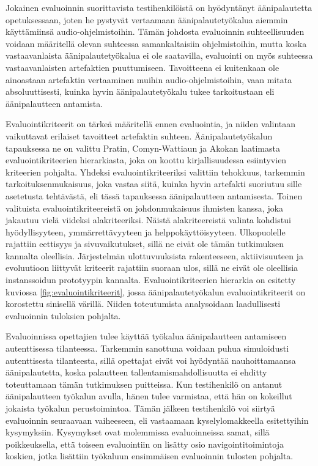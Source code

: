 \documentclass[utf8]{gradu3}
\begin{document}
Jokainen evaluoinnin suorittavista testihenkilöistä on hyödyntänyt äänipalautetta opetuksessaan, joten he pystyvät vertaamaan äänipalautetyökalua aiemmin käyttämiinsä audio-ohjelmistoihin. Tämän johdosta evaluoinnin suhteellisuuden voidaan määritellä olevan suhteessa samankaltaisiin ohjelmistoihin, mutta koska vastaavanlaista äänipalautetyökalua ei ole saatavilla, evaluointi on myös suhteessa vastaavanlaisten artefaktien puuttumiseen. Tavoitteena ei kuitenkaan ole ainoastaan artefaktin vertaaminen muihin audio-ohjelmistoihin, vaan mitata absoluuttisesti, kuinka hyvin äänipalautetyökalu tukee tarkoitustaan eli äänipalautteen antamista.

Evaluointikriteerit on tärkeä määritellä ennen evaluointia, ja niiden valintaan vaikuttavat erilaiset tavoitteet artefaktin suhteen. Äänipalautetyökalun tapauksessa ne on valittu Pratin, Comyn-Wattiaun ja Akokan \parencite*{cycles} laatimasta evaluointikriteerien hierarkiasta, joka on koottu kirjallisuudessa esiintyvien kriteerien pohjalta. Yhdeksi evaluointikriteeriksi valittiin tehokkuus, tarkemmin tarkoituksenmukaisuus, joka vastaa siitä, kuinka hyvin artefakti suoriutuu sille asetetusta tehtävästä, eli tässä tapauksessa äänipalautteen antamisesta. Toinen valituista evaluointikriteereistä on johdonmukaisuus ihmisten kanssa, joka jakautuu vielä viideksi alakriteeriksi. Näistä alakriteereistä valinta kohdistui hyödyllisyyteen, ymmärrettävyyteen ja helppokäyttöisyyteen. Ulkopuolelle rajattiin eettisyys ja sivuvaikutukset, sillä ne eivät ole tämän tutkimuksen kannalta oleellisia. Järjestelmän ulottuvuuksista rakenteeseen, aktiivisuuteen ja evoluutioon liittyvät kriteerit rajattiin suoraan ulos, sillä ne eivät ole oleellisia instanssoidun prototyypin kannalta. Evaluointikriteerien hierarkia on esitetty kuviossa \ref{fig:evaluointikriteerit}, jossa äänipalautetyökalun evaluointikriteerit on korostettu sinisellä värillä. Niiden toteutumista analysoidaan laadullisesti evaluoinnin tuloksien pohjalta.
 
Evaluoinnissa opettajien tulee käyttää työkalua äänipalautteen antamiseen autenttisessa tilanteessa. Tarkemmin sanottuna voidaan puhua simuloidusti autenttisesta tilanteesta, sillä opettajat eivät voi hyödyntää nauhoittamaansa äänipalautetta, koska palautteen tallentamismahdollisuutta ei ehditty toteuttamaan tämän tutkimuksen puitteissa. Kun testihenkilö on antanut äänipalautteen työkalun avulla, hänen tulee varmistaa, että hän on kokeillut jokaista työkalun perustoimintoa. Tämän jälkeen testihenkilö voi siirtyä evaluoinnin seuraavaan vaiheeseen, eli vastaamaan kyselylomakkeella esitettyihin kysymyksiin. Kysymykset ovat molemmissa evaluoinneissa samat, sillä poikkeuksella, että toiseen evaluointiin on lisätty osio navigointitoimintoja koskien, jotka lisättiin työkaluun ensimmäisen evaluoinnin tulosten pohjalta.
\end{document}
